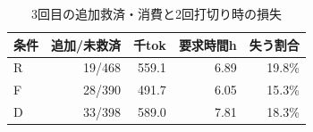 \begin{table}[tb]
\centering
\caption{3回目の追加救済・消費と2回打切り時の損失}
\label{tab:third}
\begin{tabular}{lrrrr}
\hline
条件 & 追加/未救済 & 千tok & 要求時間h & 失う割合 \\
\hline
R & 19/468 & 559.1 & 6.89 & 19.8\% \\
F & 28/390 & 491.7 & 6.05 & 15.3\% \\
D & 33/398 & 589.0 & 7.81 & 18.3\% \\
\hline
\end{tabular}
\end{table}
